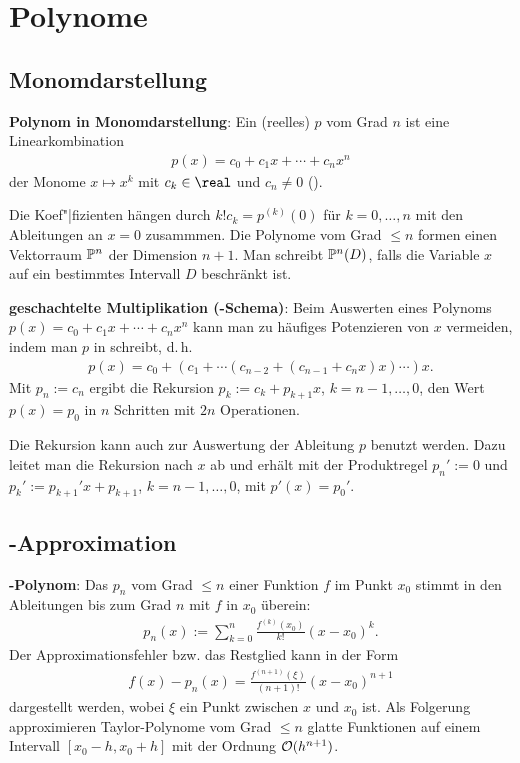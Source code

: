\chapter{%
    Polynome%
}

\section{%
    Monomdarstellung%
}

\textbf{Polynom in Monomdarstellung}:
Ein (reelles)  $p$ vom Grad $n$ ist eine Linearkombination
\begin{align*}
    p(x) = c_0 + c_1 x + \dotsb + c_n x^n
\end{align*}
der Monome $x \mapsto x^k$ mit  $c_k \in \real$ und $c_n \not= 0$
().

Die Koef"|fizienten hängen durch $k! c_k = p^{(k)}(0)$ für $k = 0, \dotsc, n$ mit den Ableitungen
an $x = 0$ zusammmen.
Die Polynome vom Grad $\le n$ formen einen Vektorraum $\P^n$ der Dimension $n + 1$.
Man schreibt $\P^n(D)$, falls die Variable $x$ auf ein bestimmtes Intervall $D$ beschränkt ist.

\linie

\textbf{geschachtelte Multiplikation (-Schema)}:
Beim Auswerten eines Polynoms\\
$p(x) = c_0 + c_1 x + \dotsb + c_n x^n$ kann man zu häufiges Potenzieren von $x$
vermeiden, indem man $p$ in  schreibt, d.\,h.
\begin{align*}
    p(x) = c_0 + (c_1 + \dotsb (c_{n-2} + (c_{n-1} + c_n x)x) \dotsb)x.
\end{align*}
Mit $p_n := c_n$ ergibt die Rekursion $p_k := c_k + p_{k+1} x$, $k = n - 1, \dotsc, 0$,
den Wert $p(x) = p_0$ in $n$ Schritten mit $2n$ Operationen.

Die Rekursion kann auch zur Auswertung der Ableitung $p$ benutzt werden.
Dazu leitet man die Rekursion nach $x$ ab und erhält mit der Produktregel
$p_n' := 0$ und $p_k' := p_{k+1}' x + p_{k+1}$, $k = n - 1, \dotsc, 0$,
mit $p'(x) = p_0'$.

\section{%
    -Approximation%
}

\textbf{-Polynom}:
Das  $p_n$ vom Grad $\le n$ einer Funktion $f$ im Punkt $x_0$
stimmt in den Ableitungen bis zum Grad $n$ mit $f$ in $x_0$ überein:
\begin{align*}
    p_n(x) := \sum_{k=0}^n \frac{f^{(k)}(x_0)}{k!} (x - x_0)^k.
\end{align*}
Der Approximationsfehler bzw. das Restglied kann in der Form
\begin{align*}
    f(x) - p_n(x) = \frac{f^{(n+1)}(\xi)}{(n + 1)!} (x - x_0)^{n+1}
\end{align*}
dargestellt werden, wobei $\xi$ ein Punkt zwischen $x$ und $x_0$ ist.
Als Folgerung approximieren Taylor-Polynome vom Grad $\le n$ glatte Funktionen auf einem
Intervall $[x_0 - h, x_0 + h]$ mit der Ordnung $\O(h^{n+1})$.

